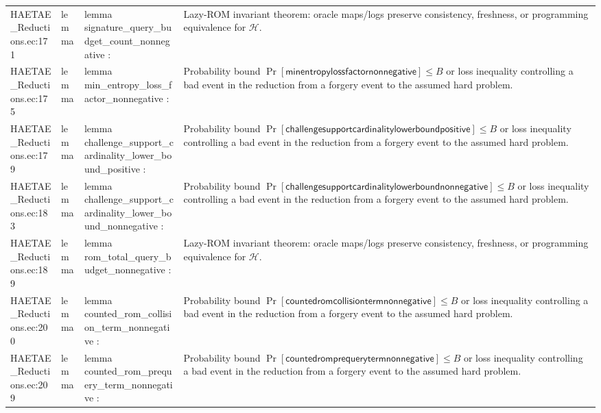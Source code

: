 \documentclass[10pt]{article}
\begin{document}
\begin{longtable}{L{0.11\textwidth}L{0.055\textwidth}L{0.385\textwidth}L{0.41\textwidth}}
HAETAE\_\allowbreak{}Reductions.\allowbreak{}ec:\allowbreak{}171 & lemma & {\ttfamily\scriptsize lemma signature\_\allowbreak{}query\_\allowbreak{}budget\_\allowbreak{}count\_\allowbreak{}nonnegative :} & Lazy-ROM invariant theorem: oracle maps/logs preserve consistency, freshness, or programming equivalence for $\mathcal H$. \\
HAETAE\_\allowbreak{}Reductions.\allowbreak{}ec:\allowbreak{}175 & lemma & {\ttfamily\scriptsize lemma min\_\allowbreak{}entropy\_\allowbreak{}loss\_\allowbreak{}factor\_\allowbreak{}nonnegative :} & Probability bound $\Pr[\mathsf{minentropylossfactornonnegative}]\le B$ or loss inequality controlling a bad event in the reduction from a forgery event to the assumed hard problem. \\
HAETAE\_\allowbreak{}Reductions.\allowbreak{}ec:\allowbreak{}179 & lemma & {\ttfamily\scriptsize lemma challenge\_\allowbreak{}support\_\allowbreak{}cardinality\_\allowbreak{}lower\_\allowbreak{}bound\_\allowbreak{}positive :} & Probability bound $\Pr[\mathsf{challengesupportcardinalitylowerboundpositive}]\le B$ or loss inequality controlling a bad event in the reduction from a forgery event to the assumed hard problem. \\
HAETAE\_\allowbreak{}Reductions.\allowbreak{}ec:\allowbreak{}183 & lemma & {\ttfamily\scriptsize lemma challenge\_\allowbreak{}support\_\allowbreak{}cardinality\_\allowbreak{}lower\_\allowbreak{}bound\_\allowbreak{}nonnegative :} & Probability bound $\Pr[\mathsf{challengesupportcardinalitylowerboundnonnegative}]\le B$ or loss inequality controlling a bad event in the reduction from a forgery event to the assumed hard problem. \\
HAETAE\_\allowbreak{}Reductions.\allowbreak{}ec:\allowbreak{}189 & lemma & {\ttfamily\scriptsize lemma rom\_\allowbreak{}total\_\allowbreak{}query\_\allowbreak{}budget\_\allowbreak{}nonnegative :} & Lazy-ROM invariant theorem: oracle maps/logs preserve consistency, freshness, or programming equivalence for $\mathcal H$. \\
HAETAE\_\allowbreak{}Reductions.\allowbreak{}ec:\allowbreak{}200 & lemma & {\ttfamily\scriptsize lemma counted\_\allowbreak{}rom\_\allowbreak{}collision\_\allowbreak{}term\_\allowbreak{}nonnegative :} & Probability bound $\Pr[\mathsf{countedromcollisiontermnonnegative}]\le B$ or loss inequality controlling a bad event in the reduction from a forgery event to the assumed hard problem. \\
HAETAE\_\allowbreak{}Reductions.\allowbreak{}ec:\allowbreak{}209 & lemma & {\ttfamily\scriptsize lemma counted\_\allowbreak{}rom\_\allowbreak{}prequery\_\allowbreak{}term\_\allowbreak{}nonnegative :} & Probability bound $\Pr[\mathsf{countedromprequerytermnonnegative}]\le B$ or loss inequality controlling a bad event in the reduction from a forgery event to the assumed hard problem. \\

\end{longtable}
\end{document}
